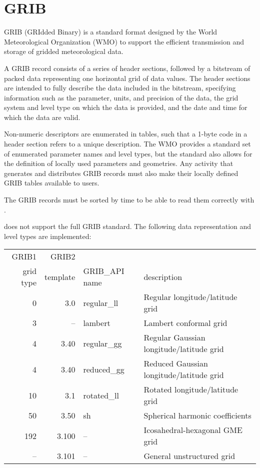 
\section{GRIB}

GRIB \cite{GRIB} (GRIdded Binary) is a standard format designed by the
World Meteorological Organization (WMO) to support the efficient 
transmission and storage of gridded meteorological data.

A GRIB record consists of a series of header sections, followed by
a bitstream of packed data representing one horizontal grid of data
values. The header sections are intended to fully describe the data
included in the bitstream, specifying information such as the
parameter, units, and precision of the data, the grid system and
level type on which the data is provided, and the date and time
for which the data are valid.

Non-numeric descriptors are enumerated in tables, such that a 1-byte
code in a header section refers to a unique description.
The WMO provides a standard set of enumerated parameter names and
level types, but the standard also allows for the definition
of locally used parameters and geometries. Any activity
that generates and distributes GRIB records must also make
their locally defined GRIB tables available to users.

The GRIB records must be sorted by time to be able to read them correctly with {\CDI}.

{\CDI} does not support the full GRIB standard. The following
data representation and level types are implemented: \\

\begin{tabular}{|r|r|l|l|}
\hline
\rowcolor[gray]{.9}
GRIB1  & GRIB2 & & \\
\rowcolor[gray]{.9}
 grid type &  template & GRIB\_API name & description \\
     0  & 3.0 & regular\_ll & Regular longitude/latitude grid \\
     3  & -- & lambert & Lambert conformal grid \\
     4  & 3.40 & regular\_gg & Regular Gaussian longitude/latitude grid \\
     4  & 3.40 & reduced\_gg & Reduced Gaussian longitude/latitude grid \\
   10  & 3.1 & rotated\_ll & Rotated  longitude/latitude grid \\
   50  & 3.50 & sh & Spherical harmonic coefficients \\
 192  & 3.100 & -- & Icosahedral-hexagonal GME grid \\
  --   & 3.101 & -- & General unstructured grid \\
\hline
\end{tabular}


